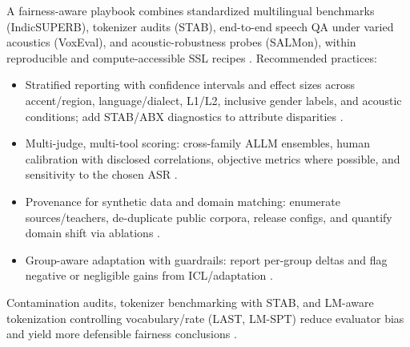 \documentclass{article}
\begin{document}
A fairness-aware playbook combines standardized multilingual benchmarks (IndicSUPERB), tokenizer audits (STAB), end-to-end speech QA under varied acoustics (VoxEval), and acoustic-robustness probes (SALMon), within reproducible and compute-accessible SSL recipes \cite{entry2025indicsuperbspeechprocessinguniversalperf,vashishth2024stabspeechtokenizerassessmentbenchmark,cui2025voxevalbenchmarkingknowledgeunderstandin,maimon2025salmonsuiteacousticlanguagemodelevaluati,chen2023reducingbarriersselfsupervisedlearninghu}. Recommended practices:
\begin{itemize}
\item Stratified reporting with confidence intervals and effect sizes across accent/region, language/dialect, L1/L2, inclusive gender labels, and acoustic conditions; add STAB/ABX diagnostics to attribute disparities \cite{vashishth2024stabspeechtokenizerassessmentbenchmark,fily2024establishingdegreesclosenessbetweenaudio,sicherman2023analysingdiscreteselfsupervisedspeechrep}.
\item Multi-judge, multi-tool scoring: cross-family ALLM ensembles, human calibration with disclosed correlations, objective metrics where possible, and sensitivity to the chosen ASR \cite{li2025televaldynamicbenchmarkdesignedspokenlan,lin2025alignslmtextlessspokenlanguagemodelsrein}.
\item Provenance for synthetic data and domain matching: enumerate sources/teachers, de-duplicate public corpora, release configs, and quantify domain shift via ablations \cite{sun2025llasofoundationalframeworkreproduciblere,wang2023slmbridgethingapbetweenspeechtextfoundat,tseng2025evaluationllmsspeechisoftenflawedtestset}.
\item Group-aware adaptation with guardrails: report per-group deltas and flag negative or negligible gains from ICL/adaptation \cite{roll2025contextlearningboostsspeechrecognitionhu}.
\end{itemize}
Contamination audits, tokenizer benchmarking with STAB, and LM-aware tokenization controlling vocabulary/rate (LAST, LM-SPT) reduce evaluator bias and yield more defensible fairness conclusions \cite{turetzky2024lastlanguagemodelawarespeechtokenization,jo2025lmsptalignedsemanticdistillationspeechto,vashishth2024stabspeechtokenizerassessmentbenchmark,tseng2025evaluationllmsspeechisoftenflawedtestset}.
\end{document}
